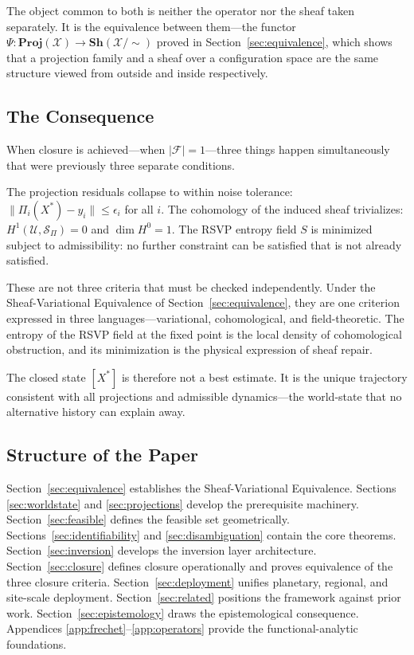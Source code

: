 \documentclass[12pt, oneside]{article}
\newcommand{\Xmod}{\mathcal{X}/{\sim}}
\begin{document}
The object common to both is neither the operator nor the sheaf taken separately. It is
the equivalence between them---the functor
$\Psi : \mathbf{Proj}(\mathcal{X}) \to \mathbf{Sh}(\Xmod)$ proved in
Section~\ref{sec:equivalence}, which shows that a projection family and a sheaf over a
configuration space are the same structure viewed from outside and inside respectively.

\subsection{The Consequence}

When closure is achieved---when $|\mathcal{F}| = 1$---three things happen simultaneously
that were previously three separate conditions.

The projection residuals collapse to within noise tolerance:
$\|\Pi_i(X^*) - y_i\| \le \epsilon_i$ for all $i$. The cohomology of the induced sheaf
trivializes: $H^1(\mathcal{U}, \mathcal{S}_\Pi) = 0$ and $\dim H^0 = 1$. The RSVP entropy
field $S$ is minimized subject to admissibility: no further constraint can be satisfied
that is not already satisfied.

These are not three criteria that must be checked independently. Under the
Sheaf-Variational Equivalence of Section~\ref{sec:equivalence}, they are one criterion
expressed in three languages---variational, cohomological, and field-theoretic. The entropy
of the RSVP field at the fixed point is the local density of cohomological obstruction,
and its minimization is the physical expression of sheaf repair.

The closed state $[X^*]$ is therefore not a best estimate. It is the unique trajectory
consistent with all projections and admissible dynamics---the world-state that no
alternative history can explain away.

\subsection{Structure of the Paper}

Section~\ref{sec:equivalence} establishes the Sheaf-Variational Equivalence. Sections
\ref{sec:worldstate} and \ref{sec:projections} develop the prerequisite machinery.
Section~\ref{sec:feasible} defines the feasible set geometrically.
Sections~\ref{sec:identifiability} and \ref{sec:disambiguation} contain the core theorems.
Section~\ref{sec:inversion} develops the inversion layer architecture.
Section~\ref{sec:closure} defines closure operationally and proves equivalence of the three
closure criteria. Section~\ref{sec:deployment} unifies planetary, regional, and site-scale
deployment. Section~\ref{sec:related} positions the framework against prior work.
Section~\ref{sec:epistemology} draws the epistemological consequence. Appendices
\ref{app:frechet}--\ref{app:operators} provide the functional-analytic foundations.
\end{document}

